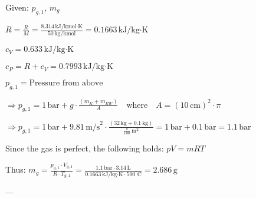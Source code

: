 Given: \( p_{g,1} \), \( m_g \)  

\( R = \frac{R}{M} = \frac{8.314 \, \text{kJ/kmol·K}}{50 \, \text{kg/kmol}} = 0.1663 \, \text{kJ/kg·K} \)  

\( c_V = 0.633 \, \text{kJ/kg·K} \)  

\( c_P = R + c_V = 0.7993 \, \text{kJ/kg·K} \)  

\( p_{g,1} = \text{Pressure from above} \)  

\( \Rightarrow p_{g,1} = 1 \, \text{bar} + g \cdot \frac{(m_K + m_{EW})}{A} \quad \text{where} \quad A = (10 \, \text{cm})^2 \cdot \pi \)  

\( \Rightarrow p_{g,1} = 1 \, \text{bar} + 9.81 \, \text{m/s}^2 \cdot \frac{(32 \, \text{kg} + 0.1 \, \text{kg})}{\frac{\pi}{100} \, \text{m}^2} = 1 \, \text{bar} + 0.1 \, \text{bar} = 1.1 \, \text{bar} \)  

Since the gas is perfect, the following holds:  
\( pV = mRT \)  

Thus:  
\( m_g = \frac{p_{g,1} \cdot V_{g,1}}{R \cdot T_{g,1}} = \frac{1.1 \, \text{bar} \cdot 3.14 \, \text{L}}{0.1663 \, \text{kJ/kg·K} \cdot 500^\circ \text{C}} = 2.686 \, \text{g} \)  

---